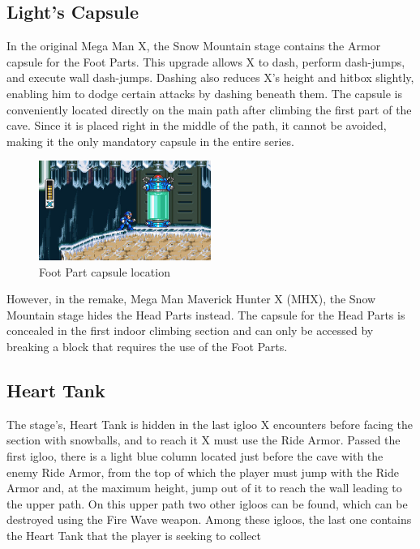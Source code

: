 \subsection{Light's Capsule}\label{X:Foot_Parts}

In the original Mega Man X, the Snow Mountain stage contains the Armor capsule for the Foot Parts. This upgrade allows X to dash, perform dash-jumps, and execute wall dash-jumps. Dashing also reduces X's height and hitbox slightly, enabling him to dodge certain attacks by dashing beneath them. The capsule is conveniently located directly on the main path after climbing the first part of the cave. Since it is placed right in the middle of the path, it cannot be avoided, making it the only mandatory capsule in the entire series.
\begin{figure}[htp]
	\centering
	\includegraphics[width=0.5\textwidth]{figures/X1/Chill_penguin/Armor_foot.jpg}
	\caption{Foot Part capsule location}
\end{figure}

However, in the remake, Mega Man Maverick Hunter X (MHX), the Snow Mountain stage hides the Head Parts instead. The capsule for the Head Parts is concealed in the first indoor climbing section and can only be accessed by breaking a block that requires the use of the Foot Parts.


\subsection{Heart Tank}\label{Penguin:heart_tank}

The stage's, Heart Tank is hidden in the last igloo X encounters before facing the section with snowballs, and to reach it X must use the Ride Armor. Passed the first igloo, there is a light blue column located just before the cave with the enemy Ride Armor,  from the top of which the player must jump with the Ride Armor and, at the maximum height, jump out of it to reach the wall leading to the upper path. On this upper path two other igloos can be found, which can be destroyed using the Fire Wave weapon. Among these igloos, the last one contains the Heart Tank that the player is seeking to collect

